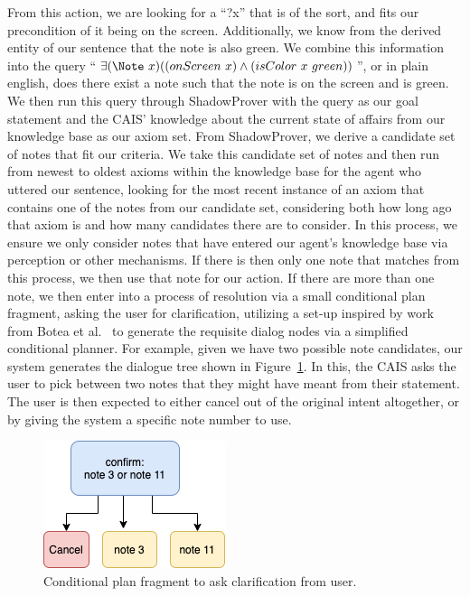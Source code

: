 From this action, we are looking for a ``?x'' that is of the \Note sort, and fits our
precondition of it being on the screen. Additionally, we know from the derived entity of
our sentence that the note is also green. We combine this information into the query
``$\exists(\Note\ x)((onScreen\ x) \land (isColor\ x\ green))$'', or in plain english, does there exist 
a note such that the note is on the screen and is green. We then run this query through
ShadowProver with the query as our goal statement and the CAIS' knowledge about the current
state of affairs from our knowledge base as our axiom set. From ShadowProver, we derive
a candidate set of notes that fit our criteria. We take this candidate set of notes and
then run from newest to oldest axioms within the knowledge base for the agent who uttered
our sentence, looking for the most recent instance of an axiom that contains one of the
notes from our candidate set, considering both how long ago that axiom is and how many
candidates there are to consider. In this process, we ensure we only consider notes that
have entered our agent's knowledge base via perception or other mechanisms. If there is
then only one note that matches from this process, we then use that note for our action.
If there are more than one note, we then enter into a process of resolution via a small
conditional plan fragment, asking the user for clarification, utilizing a set-up inspired
by work from Botea et al.~\cite{botea_generating_2019} to generate the requisite dialog
nodes via a simplified conditional planner. For example, given we have two possible note
candidates, our system generates the dialogue tree shown in 
Figure~\ref{fig:intent_resolution_fragment}. In this, the CAIS asks the user to pick between
two  notes that they might have meant from their statement. The user is then expected to either
cancel out of the original intent altogether, or by giving the system a specific note number
to use.

\begin{figure}
\centering
  \includegraphics[width=0.4\columnwidth]{chapters/06_planning/figures/intent_resolution_fragment.png}
  \caption{Conditional plan fragment to ask clarification from user.}
  \label{fig:intent_resolution_fragment}
\end{figure}